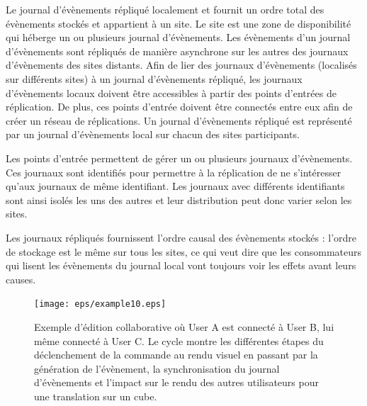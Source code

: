 Le journal d'évènements répliqué localement et fournit un ordre total des 
évènements stockés et appartient à un site. 
Le site est une zone de disponibilité qui héberge un ou plusieurs 
journal d'évènements. Les évènements d'un journal d'évènements sont 
répliqués de manière asynchrone sur les autres des journaux d'évènements 
des sites distants. 
Afin de lier des journaux d'évènements (localisés sur différents sites) à un journal 
d'évènements répliqué, les 
journaux d'évènements locaux doivent être accessibles à partir des points 
d'entrées de réplication. De plus, ces points d'entrée doivent être 
connectés entre eux afin de créer un réseau de réplications. 
Un journal d'évènements répliqué est représenté par un journal d'évènements local 
sur chacun des sites participants.


Les points d'entrée permettent de gérer un ou plusieurs journaux d'évènements. 
Ces journaux sont identifiés pour permettre à la réplication de ne s'intéresser 
qu'aux journaux de même identifiant. 
Les journaux avec différents identifiants sont ainsi isolés les uns des autres et 
leur distribution peut donc varier selon les sites.

Les journaux répliqués fournissent l'ordre causal des évènements stockés : l'ordre 
de stockage est le même sur tous les sites, ce qui veut dire que les 
consommateurs qui lisent les évènements du journal local vont toujours voir les 
effets avant leurs causes.


\begin{figure}[ht]
	\centering
	\texttt{[image: eps/example10.eps]}
	\caption[Flux de la collaboration dans le framework 3DEvent entre 3 
	utilisateurs]{Exemple d'édition collaborative où User A est connecté à User  B, 
	lui 
	même connecté à User C. Le cycle montre les différentes étapes du 
	déclenchement de la commande au rendu visuel en passant par la génération 
	de l'évènement, la 
	synchronisation du journal d'évènements et l'impact sur le rendu des autres 
	utilisateurs pour une translation sur un cube.}
\end{figure}

